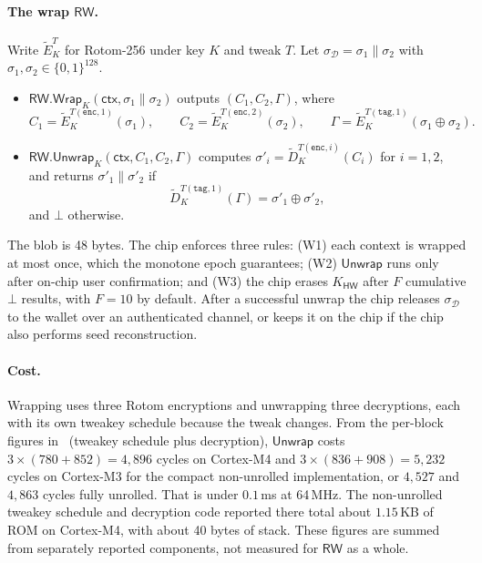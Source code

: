 \documentclass[11pt]{article}
\theoremstyle{remark}
\begin{document}
\paragraph{The wrap $\mathsf{RW}$.} Write $\widetilde{E}^{T}_{K}$ for Rotom-256 under key $K$ and tweak $T$. Let $\sigma_{\mathcal{D}} = \sigma_1 \| \sigma_2$ with $\sigma_1, \sigma_2 \in \{0,1\}^{128}$.
\begin{itemize}
  \item $\mathsf{RW.Wrap}_K(\mathsf{ctx}, \sigma_1\|\sigma_2)$ outputs $(C_1, C_2, \Gamma)$, where
  \[
  C_1 = \widetilde{E}_K^{T(\mathtt{enc},1)}(\sigma_1),\qquad
  C_2 = \widetilde{E}_K^{T(\mathtt{enc},2)}(\sigma_2),\qquad
  \Gamma = \widetilde{E}_K^{T(\mathtt{tag},1)}(\sigma_1 \oplus \sigma_2).
  \]
  \item $\mathsf{RW.Unwrap}_K(\mathsf{ctx}, C_1, C_2, \Gamma)$ computes $\sigma'_i = \widetilde{D}_K^{T(\mathtt{enc},i)}(C_i)$ for $i = 1,2$, and returns $\sigma'_1\|\sigma'_2$ if
  \[
  \widetilde{D}_K^{T(\mathtt{tag},1)}(\Gamma) = \sigma'_1 \oplus \sigma'_2,
  \]
  and $\bot$ otherwise.
\end{itemize}
The blob is 48 bytes. The chip enforces three rules: (W1) each context is wrapped at most once, which the monotone epoch guarantees; (W2) $\mathsf{Unwrap}$ runs only after on-chip user confirmation; and (W3) the chip erases $K_{\mathsf{HW}}$ after $F$ cumulative $\bot$ results, with $F = 10$ by default. After a successful unwrap the chip releases $\sigma_{\mathcal{D}}$ to the wallet over an authenticated channel, or keeps it on the chip if the chip also performs seed reconstruction.

\paragraph{Cost.} Wrapping uses three Rotom encryptions and unwrapping three decryptions, each with its own tweakey schedule because the tweak changes. From the per-block figures in~\cite[Table~11]{rotom26} (tweakey schedule plus decryption), $\mathsf{Unwrap}$ costs $3\times(780+852) = 4{,}896$ cycles on Cortex-M4 and $3\times(836+908) = 5{,}232$ cycles on Cortex-M3 for the compact non-unrolled implementation, or $4{,}527$ and $4{,}863$ cycles fully unrolled. That is under $0.1$\,ms at 64\,MHz. The non-unrolled tweakey schedule and decryption code reported there total about $1.15$\,KB of ROM on Cortex-M4, with about 40 bytes of stack. These figures are summed from separately reported components, not measured for $\mathsf{RW}$ as a whole.
\end{document}
